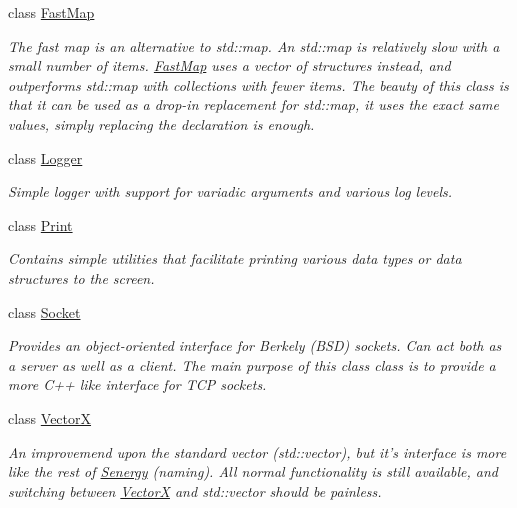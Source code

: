 \begin{DoxyCompactItemize}
class \hyperlink{class_senergy_1_1_fast_map}{Fast\-Map}
\begin{DoxyCompactList}\small\item\em The fast map is an alternative to std\-::map. An std\-::map is relatively slow with a small number of items. \hyperlink{class_senergy_1_1_fast_map}{Fast\-Map} uses a vector of structures instead, and outperforms std\-::map with collections with fewer items. The beauty of this class is that it can be used as a drop-\/in replacement for std\-::map, it uses the exact same values, simply replacing the declaration is enough. \end{DoxyCompactList}\item 
class \hyperlink{class_senergy_1_1_logger}{Logger}
\begin{DoxyCompactList}\small\item\em Simple logger with support for variadic arguments and various log levels. \end{DoxyCompactList}\item 
class \hyperlink{class_senergy_1_1_print}{Print}
\begin{DoxyCompactList}\small\item\em Contains simple utilities that facilitate printing various data types or data structures to the screen. \end{DoxyCompactList}\item 
class \hyperlink{class_senergy_1_1_socket}{Socket}
\begin{DoxyCompactList}\small\item\em Provides an object-\/oriented interface for Berkely (B\-S\-D) sockets. Can act both as a server as well as a client. The main purpose of this class class is to provide a more C++ like interface for T\-C\-P sockets. \end{DoxyCompactList}\item 
class \hyperlink{class_senergy_1_1_vector_x}{Vector\-X}
\begin{DoxyCompactList}\small\item\em An improvemend upon the standard vector (std\-::vector), but it's interface is more like the rest of \hyperlink{namespace_senergy}{Senergy} (naming). All normal functionality is still available, and switching between \hyperlink{class_senergy_1_1_vector_x}{Vector\-X} and std\-::vector should be painless. \end{DoxyCompactList}\end{DoxyCompactItemize}
